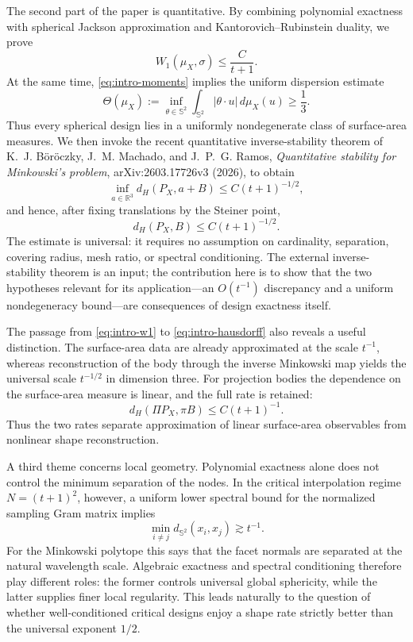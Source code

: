 \documentclass[11pt]{article}
\theoremstyle{definition}
\theoremstyle{remark}
\newcommand{\Sph}{\mathbb S}
\newcommand{\R}{\mathbb R}
\begin{document}
The second part of the paper is quantitative. By combining polynomial exactness with spherical Jackson approximation and Kantorovich--Rubinstein duality, we prove
\begin{equation}\label{eq:intro-w1}
W_1(\mu_X,\sigma)\le \frac{C}{t+1}.
\end{equation}
At the same time, \eqref{eq:intro-moments} implies the uniform dispersion estimate
\[
\Theta(\mu_X):=\inf_{\theta\in\Sph^2}\int_{\Sph^2}|\theta\cdot u|\,d\mu_X(u)\ge\frac13.
\]
Thus every spherical design lies in a uniformly nondegenerate class of surface-area measures. We then invoke the recent quantitative inverse-stability theorem of K.~J. B\"or\"oczky, J.~M. Machado, and J.~P.~G. Ramos, \emph{Quantitative stability for Minkowski's problem}, arXiv:2603.17726v3 (2026), to obtain
\begin{equation}\label{eq:intro-hausdorff}
\inf_{a\in\R^3}d_H(P_X,a+B)\le C(t+1)^{-1/2},
\end{equation}
and hence, after fixing translations by the Steiner point,
\[
d_H(P_X,B)\le C(t+1)^{-1/2}.
\]
The estimate is universal: it requires no assumption on cardinality, separation, covering radius, mesh ratio, or spectral conditioning. The external inverse-stability theorem is an input; the contribution here is to show that the two hypotheses relevant for its application---an $O(t^{-1})$ discrepancy and a uniform nondegeneracy bound---are consequences of design exactness itself.

The passage from \eqref{eq:intro-w1} to \eqref{eq:intro-hausdorff} also reveals a useful distinction. The surface-area data are already approximated at the scale $t^{-1}$, whereas reconstruction of the body through the inverse Minkowski map yields the universal scale $t^{-1/2}$ in dimension three. For projection bodies the dependence on the surface-area measure is linear, and the full rate is retained:
\begin{equation}\label{eq:intro-projection}
d_H(\Pi P_X,\pi B)\le C(t+1)^{-1}.
\end{equation}
Thus the two rates separate approximation of linear surface-area observables from nonlinear shape reconstruction.

A third theme concerns local geometry. Polynomial exactness alone does not control the minimum separation of the nodes. In the critical interpolation regime $N=(t+1)^2$, however, a uniform lower spectral bound for the normalized sampling Gram matrix implies
\[
\min_{i\ne j}d_{\Sph^2}(x_i,x_j)\gtrsim t^{-1}.
\]
For the Minkowski polytope this says that the facet normals are separated at the natural wavelength scale. Algebraic exactness and spectral conditioning therefore play different roles: the former controls universal global sphericity, while the latter supplies finer local regularity. This leads naturally to the question of whether well-conditioned critical designs enjoy a shape rate strictly better than the universal exponent $1/2$.
\end{document}
